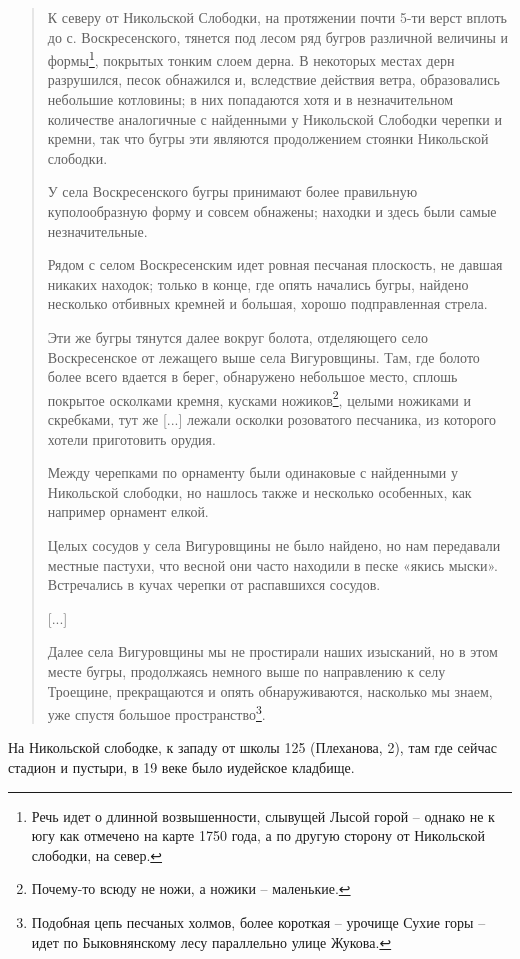 \begin{quotation}
К северу от Никольской Слободки, на протяжении почти 5-ти верст вплоть до с. Воскресенского, тянется под лесом ряд бугров различной величины и формы\footnote{Речь идет о длинной возвышенности, слывущей Лысой горой – однако не к югу как отмечено на карте 1750 года, а по другую сторону от Никольской слободки, на север.}, покрытых тонким слоем дерна. В некоторых местах дерн разрушился, песок обнажился и, вследствие действия ветра, образовались небольшие котловины; в них попадаются хотя и в незначительном количестве аналогичные с найденными у Никольской Слободки черепки и кремни, так что бугры эти являются продолжением стоянки Никольской слободки.

У села Воскресенского бугры принимают более правильную куполообразную форму и совсем обнажены; находки и здесь были самые незначительные.

Рядом с селом Воскресенским идет ровная песчаная плоскость, не давшая никаких находок; только в конце, где опять начались бугры, найдено несколько отбивных кремней и большая, хорошо подправленная стрела. 

Эти же бугры тянутся далее вокруг болота, отделяющего село Воскресенское от лежащего выше села Вигуровщины. Там, где болото более всего вдается в берег, обнаружено небольшое место, сплошь покрытое осколками кремня, кусками ножиков\footnote{Почему-то всюду не ножи, а ножики – маленькие.}, целыми ножиками и скребками, тут же [...] лежали осколки розоватого песчаника, из которого хотели приготовить орудия.

Между черепками по орнаменту были одинаковые с найденными у Никольской слободки, но нашлось также и несколько особенных, как например орнамент елкой.

Целых сосудов у села Вигуровщины не было найдено, но нам передавали местные пастухи, что весной они часто находили в песке «якись мыски». Встречались в кучах черепки от распавшихся сосудов.

[...]

Далее села Вигуровщины мы не простирали наших изысканий, но в этом месте бугры, продолжаясь немного выше по направлению к селу Троещине, прекращаются и опять обнаруживаются, насколько мы знаем, уже спустя большое пространство\footnote{Подобная цепь песчаных холмов, более короткая – урочище Сухие горы – идет по Быковнянскому лесу параллельно улице Жукова.}.
\end{quotation}

На Никольской слободке, к западу от школы 125 (Плеханова, 2), там где сейчас стадион и пустыри, в 19 веке было иудейское кладбище.

